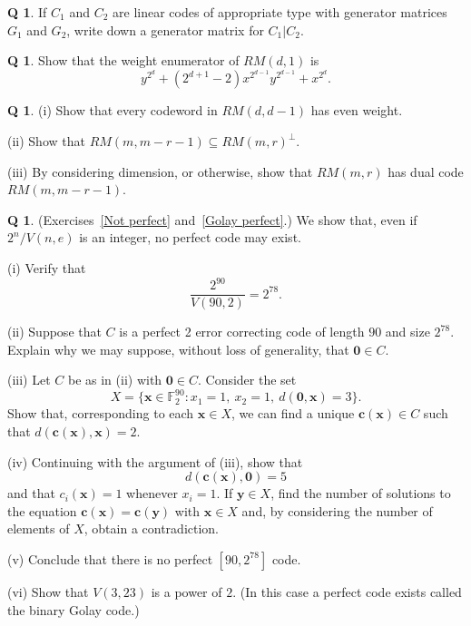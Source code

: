 \documentclass[12pt,a4paper]{article}
\theoremstyle{plain}
\theoremstyle{definition}
\newtheorem{question}[theorem]{Q}
\begin{document}
\begin{question}\label{3.5}
If $C_{1}$ and $C_{2}$ are linear codes of appropriate
type with generator matrices $G_{1}$ and $G_{2}$,
write down a generator matrix for $C_{1}|C_{2}$.
\end{question}
\begin{question}\label{C3.6}
Show that the weight enumerator
of $RM(d,1)$ is
\[y^{2^{d}}+(2^{d+1}-2)x^{2^{d-1}}y^{2^{d-1}}+x^{2^{d}}.\]
\end{question}
\begin{question}\label{C3.7} 
(i) Show that every codeword in $RM(d,d-1)$ has even weight.

(ii) Show that $RM(m,m-r-1)\subseteq RM(m,r)^{\perp}$.

(iii) By considering dimension, or otherwise, show
that $RM(m,r)$ has dual code $RM(m,m-r-1)$.
\end{question}
\begin{question}\label{C3.8}
(Exercises~\ref{Not perfect} and~\ref{Golay perfect}.) 
We show that,
even if $2^{n}/V(n,e)$ is an integer,
no perfect code may exist.

(i) Verify that
\[\frac{2^{90}}{V(90,2)}=2^{78}.\]

(ii) Suppose that $C$ is a perfect 2 error correcting
code of length $90$ and size $2^{78}$. Explain
why we may suppose, without loss of generality,
that ${\boldsymbol 0}\in C$.

(iii) Let $C$ be as in (ii) with ${\boldsymbol 0}\in C$.
Consider the set
\[X=\{{\mathbf x}\in{\mathbb F}_{2}^{90}:
x_{1}=1,\ x_{2}=1,\ d({\boldsymbol 0},{\mathbf x})=3\}.\]
Show that, corresponding to each ${\mathbf x}\in X$,
we can find a unique ${\mathbf c}({\mathbf x})\in C$
such that $d({\mathbf c}({\mathbf x}),{\mathbf x})=2$.


(iv) Continuing with the argument of (iii), show
that
\[d({\mathbf c}({\mathbf x}),{\boldsymbol 0})=5\]
and that $c_{i}({\mathbf x})=1$ whenever $x_{i}=1$.
If  $\mathbf{y}\in X$,
find the number of solutions to the equation
${\mathbf c}({\mathbf x})={\mathbf c}({\mathbf y})$
with $\mathbf{x}\in X$
and, by considering the number of elements of $X$,
obtain a contradiction.

(v) Conclude that there is no perfect $[90,2^{78}]$ code.

(vi) Show that $V(3,23)$ is a power of $2$. (In this case
a perfect code exists called the binary Golay code.)
\end{question}
\end{document}
